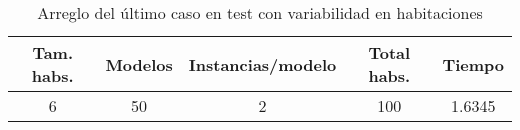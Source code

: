 \begin{table}[H]
\begin{center}
	\begin{tabular}{ | c | c | c | c | c | }
\hline
Tam. habs. & Modelos & Instancias/modelo & Total habs. & Tiempo \\ \hline 
6 & 50 & 2 & 100 & 1.6345 \\ 
\hline
	\end{tabular}
\end{center}
\caption{Arreglo del último caso en test con variabilidad en habitaciones}
\label{table:optvarfix}
\end{table}



